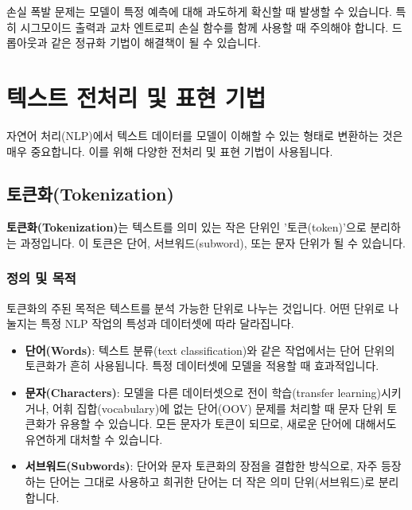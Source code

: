 \documentclass[11pt,a4paper]{article}
\theoremstyle{definition}
\begin{document}
\begin{tcolorbox}[warningbox, title=\textbf{주의}]
손실 폭발 문제는 모델이 특정 예측에 대해 과도하게 확신할 때 발생할 수 있습니다. 특히 시그모이드 출력과 교차 엔트로피 손실 함수를 함께 사용할 때 주의해야 합니다. 드롭아웃과 같은 정규화 기법이 해결책이 될 수 있습니다.
\end{tcolorbox}

\newpage
\section{텍스트 전처리 및 표현 기법}

자연어 처리(NLP)에서 텍스트 데이터를 모델이 이해할 수 있는 형태로 변환하는 것은 매우 중요합니다. 이를 위해 다양한 전처리 및 표현 기법이 사용됩니다.

\subsection{토큰화(Tokenization)}

\begin{tcolorbox}[conceptbox, title=\textbf{핵심 개념}]
\textbf{토큰화(Tokenization)}는 텍스트를 의미 있는 작은 단위인 '토큰(token)'으로 분리하는 과정입니다. 이 토큰은 단어, 서브워드(subword), 또는 문자 단위가 될 수 있습니다.
\end{tcolorbox}

\subsubsection{정의 및 목적}
토큰화의 주된 목적은 텍스트를 분석 가능한 단위로 나누는 것입니다. 어떤 단위로 나눌지는 특정 NLP 작업의 특성과 데이터셋에 따라 달라집니다.

\begin{itemize}
    \item \textbf{단어(Words)}: 텍스트 분류(text classification)와 같은 작업에서는 단어 단위의 토큰화가 흔히 사용됩니다. 특정 데이터셋에 모델을 적용할 때 효과적입니다.
    \item \textbf{문자(Characters)}: 모델을 다른 데이터셋으로 전이 학습(transfer learning)시키거나, 어휘 집합(vocabulary)에 없는 단어(OOV) 문제를 처리할 때 문자 단위 토큰화가 유용할 수 있습니다. 모든 문자가 토큰이 되므로, 새로운 단어에 대해서도 유연하게 대처할 수 있습니다.
    \item \textbf{서브워드(Subwords)}: 단어와 문자 토큰화의 장점을 결합한 방식으로, 자주 등장하는 단어는 그대로 사용하고 희귀한 단어는 더 작은 의미 단위(서브워드)로 분리합니다.
\end{itemize}
\end{document}
